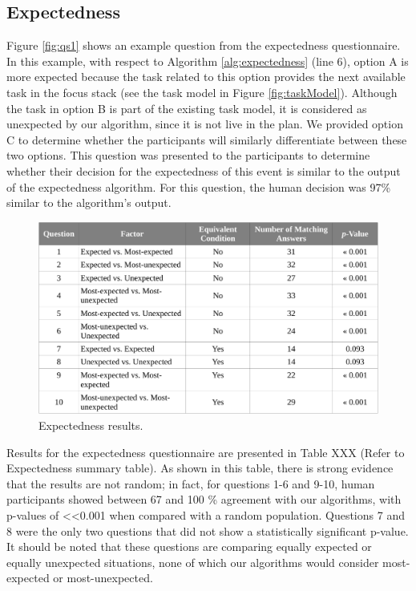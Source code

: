\documentclass[12pt]{report}
\begin{document}
\subsection{Expectedness}
\label{sec:expectedness-crowdsourcing}
Figure \ref{fig:qs1} shows an example question from the expectedness
questionnaire. In this example, with respect to Algorithm
\ref{alg:expectedness} (line 6), option A is more expected because the task
related to this option provides the next available task in the focus stack (see
the task model in Figure \ref{fig:taskModel}). Although the task in option B is
part of the existing task model, it is considered as unexpected by our
algorithm, since it is not live in the plan. We provided option C to determine
whether the participants will similarly differentiate between these two
options. This question was presented to the participants to determine whether
their decision for the expectedness of this event is similar to the output of
the expectedness algorithm. For this question, the human decision was 97\%
similar to the algorithm's output. 

\begin{figure}[tbh]
  \centering
  \includegraphics[width=1\textwidth]{figure/expectedness_result_croped.pdf}
  \caption{Expectedness results.}
  \label{fig:expectedness_result}
\end{figure}

Results for the expectedness questionnaire are presented in Table XXX (Refer to
Expectedness summary table). As shown in this table, there is strong evidence
that the results are not random; in fact, for questions 1-6 and 9-10, human
participants showed between 67 and 100 \% agreement with our algorithms, with
p-values of <<0.001 when compared with a random population. Questions 7 and 8
were the only two questions that did not show a statistically significant
p-value. It should be noted that these questions are comparing equally expected
or equally unexpected situations, none of which our algorithms would consider
most-expected or most-unexpected. 
\end{document}
